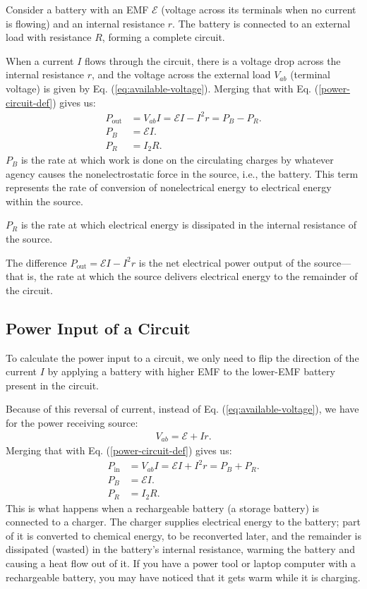 \documentclass[12pt,b4paper]{article}
\begin{document}
Consider a battery with an EMF $\mathcal{E}$ (voltage across its terminals when no current is flowing) and an internal resistance $r$. The battery is connected to an external load with resistance $R$, forming a complete circuit.

When a current $I$ flows through the circuit, there is a voltage drop across the internal resistance $r$, and the voltage across the external load $V_{ab}$ (terminal voltage) is given by Eq. (\ref{eq:available-voltage}). Merging that with Eq. (\ref{power-circuit-def}) gives us:
\begin{align}
    P_\text{out}&=V_{ab}I=\mathcal{E}I-I^2r=P_B-P_R.\\
    P_B&=\mathcal{E}I.\\
    P_R&=I_2R.
\end{align}
$P_B$ is the rate at which work is done on the circulating charges by whatever agency causes the nonelectrostatic force in the source, i.e., the battery. This term represents the rate of conversion of
nonelectrical energy to electrical energy within the source.

$P_R$ is the rate at which electrical energy is dissipated in the internal resistance of the source. 

The difference $P_\text{out}=\mathcal{E}I-I^2r$ is the net electrical power output of the source—that is, the rate at which
the source delivers electrical energy to the remainder of the circuit.
\subsection{Power Input of a Circuit}
To calculate the power input to a circuit, we only need to flip the direction of the current $I$ by applying a battery with higher EMF to the lower-EMF battery present in the circuit.

Because of this reversal of current, instead of Eq. (\ref{eq:available-voltage}), we have for the power receiving source:
\begin{align}
    V_{ab}=\mathcal{E}+Ir.
\end{align}
Merging that with Eq. (\ref{power-circuit-def}) gives us:
\begin{align}
    P_\text{in}&=V_{ab}I=\mathcal{E}I+I^2r=P_B+P_R.\\
    P_B&=\mathcal{E}I.\\
    P_R&=I_2R.
\end{align}
This is what happens when a rechargeable battery (a storage battery) is connected to a charger. The charger supplies electrical energy to the battery; part of it is converted to chemical energy, to be reconverted later, and the remainder is dissipated (wasted) in the battery’s internal resistance, warming the battery and causing a heat flow out of it. If you have a power tool or laptop computer with a rechargeable battery, you may have noticed that it gets warm while it is charging.
\end{document}
